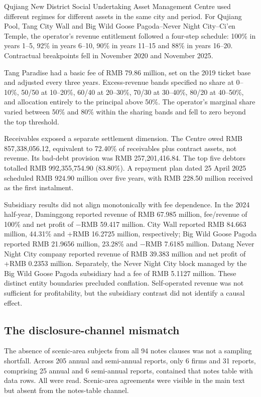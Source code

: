 \documentclass[review,3p,times]{elsarticle}
\begin{document}
Qujiang New District Social Undertaking Asset Management Centre used different regimes for different assets in the same city and period. For Qujiang Pool, Tang City Wall and Big Wild Goose Pagoda--Never Night City--Ci'en Temple, the operator's revenue entitlement followed a four-step schedule: 100\% in years 1--5, 92\% in years 6--10, 90\% in years 11--15 and 88\% in years 16--20. Contractual breakpoints fell in November 2020 and November 2025.

Tang Paradise had a basic fee of RMB 79.86 million, set on the 2019 ticket base and adjusted every three years. Excess-revenue bands specified no share at 0--10\%, 50/50 at 10--20\%, 60/40 at 20--30\%, 70/30 at 30--40\%, 80/20 at 40--50\%, and allocation entirely to the principal above 50\%. The operator's marginal share varied between 50\% and 80\% within the sharing bands and fell to zero beyond the top threshold.

Receivables exposed a separate settlement dimension. The Centre owed RMB 857,338,056.12, equivalent to 72.40\% of receivables plus contract assets, not revenue. Its bad-debt provision was RMB 257,201,416.84. The top five debtors totalled RMB 992,355,754.90 (83.80\%). A repayment plan dated 25 April 2025 scheduled RMB 924.90 million over five years, with RMB 228.50 million received as the first instalment.

Subsidiary results did not align monotonically with fee dependence. In the 2024 half-year, Daminggong reported revenue of RMB 67.985 million, fee/revenue of 100\% and net profit of \ensuremath{-}RMB 59.417 million. City Wall reported RMB 84.663 million, 44.31\% and +RMB 16.2725 million, respectively; Big Wild Goose Pagoda reported RMB 21.9656 million, 23.28\% and \ensuremath{-}RMB 7.6185 million. Datang Never Night City company reported revenue of RMB 39.383 million and net profit of +RMB 0.2353 million. Separately, the Never Night City block managed by the Big Wild Goose Pagoda subsidiary had a fee of RMB 5.1127 million. These distinct entity boundaries precluded conflation. Self-operated revenue was not sufficient for profitability, but the subsidiary contrast did not identify a causal effect.

\subsection{The disclosure-channel mismatch}

The absence of scenic-area subjects from all 94 notes clauses was not a sampling shortfall. Across 205 annual and semi-annual reports, only 6 firms and 31 reports, comprising 25 annual and 6 semi-annual reports, contained that notes table with data rows. All were read. Scenic-area agreements were visible in the main text but absent from the notes-table channel.
\end{document}
